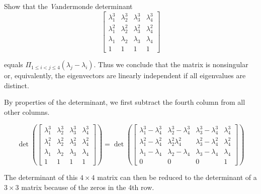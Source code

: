 \item [3.15] Show that the \emph Vandermonde determinant
\begin{equation*}
 \begin{bmatrix}
  \lambda_1^3 & \lambda_2^3 & \lambda_3^3 & \lambda_4^3 \\
  \lambda_1^2 & \lambda_2^2 & \lambda_3^2 & \lambda_4^2 \\
  \lambda_1 & \lambda_2 & \lambda_3 & \lambda_4 \\
  1 & 1 & 1 & 1
 \end{bmatrix}
\end{equation*}

equals $ \Pi_{1 \leq i < j \leq 4} (\lambda_j - \lambda_i)$.
Thus we conclude that the matrix is nonsingular or, equivalently, the eigenvectors are linearly independent if all eigenvalues are distinct.

By properties of the determinant, we first subtract
the fourth column from all other columns.

\begin{equation*}
\det\left(
 \begin{bmatrix}
  \lambda_1^3 & \lambda_2^3 & \lambda_3^3 & \lambda_4^3 \\
  \lambda_1^2 & \lambda_2^2 & \lambda_3^2 & \lambda_4^2 \\
  \lambda_1 & \lambda_2 & \lambda_3 & \lambda_4 \\
  1 & 1 & 1 & 1
 \end{bmatrix}
\right)
=
\det\left( \begin{bmatrix}
  \lambda_1^3 -\lambda_4^3 & \lambda_2^3 -\lambda_4^3 & \lambda_3^3 -\lambda_4^3 & \lambda_4^3 \\
  \lambda_1^2 - \lambda_4^2 & \lambda_2^2 \lambda_4^2 & \lambda_3^2 - \lambda_4^2 & \lambda_4^2 \\
  \lambda_1 - \lambda_4 & \lambda_2 - \lambda_4& \lambda_3- \lambda_4 & \lambda_4 \\
  0 & 0 & 0 & 1
 \end{bmatrix}\right)
\end{equation*}

The determinant of this $4\times 4$ matrix can then be reduced to
the determinant of a $3\times 3$ matrix
because of the zeros in the 4th row.

